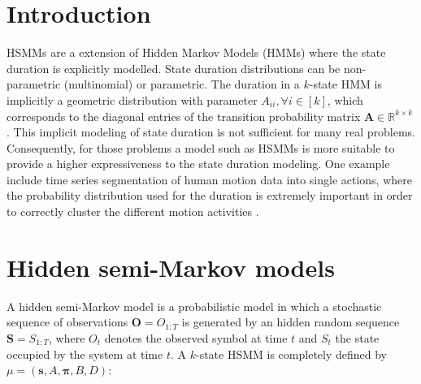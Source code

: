 \documentclass[extendedabs]{recpad2k}
\begin{document}
\section{Introduction}
\label{sec:intro}
HSMMs are a extension of Hidden Markov Models (HMMs) where the state duration is explicitly modelled. State duration distributions can be non-parametric (multinomial) or parametric. The duration in a $k$-state HMM is implicitly a geometric distribution with parameter $A_{ii}, \forall{i\in [k]}$, which corresponds to the diagonal entries of the transition probability matrix $\boldsymbol{A}\in \mathbb{R}^{k\times k}$. %
This implicit modeling of state duration is not sufficient for many real problems. Consequently, for those problems a model such as HSMMs is more suitable to provide a higher expressiveness to the state duration modeling. One example include time series segmentation of human motion data into single actions, where the probability distribution used for the duration is extremely important in order to correctly cluster the different motion activities \cite{nakamura2017segmenting}. %
\vspace*{-2pt}
\section{Hidden semi-Markov models}
\label{sec:hsmm}
A hidden semi-Markov model is a probabilistic model in which a stochastic sequence of observations $\textbf{O}=O_{1:T}$ is generated by an hidden random sequence $\textbf{S} = S_{1:T}$, where $O_t$ denotes the observed symbol at time $t$ and $S_t$ the state occupied by the system at time $t$. A $k$-state HSMM is completely defined by $\mu=(\mathbf{s}, A, \boldsymbol{\pi}, B, D)$:
\end{document}
